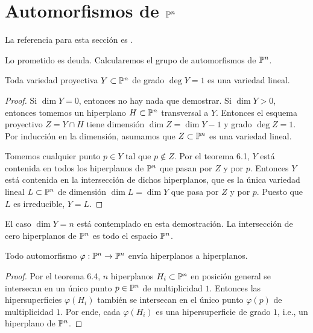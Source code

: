 \section{Automorfismos de $\P^n$}

\noindent La referencia para esta sección es \cite[pp. 228-229]{harris}.

\begin{preliminaries}
Lo prometido es deuda. Calcularemos el grupo de automorfismos de $\P^n$.
\end{preliminaries}

\begin{proposition}
Toda variedad proyectiva $Y \subset \P^n$ de grado $\deg Y = 1$ es una variedad lineal.
\end{proposition}

\begin{proof}
Si $\dim Y = 0$, entonces no hay nada que demostrar. Si $\dim Y > 0$, entonces tomemos un hiperplano $H \subset \P^n$ transversal a $Y$. Entonces el esquema proyectivo $Z = Y \cap H$ tiene dimensión $\dim Z = \dim Y - 1$ y grado $\deg Z = 1$. Por inducción en la dimensión, asumamos que $Z \subset \P^n$ es una variedad lineal.

Tomemos cualquier punto $p \in Y$ tal que $p \notin Z$. Por el teorema 6.1, $Y$ está contenida en todos los hiperplanos de $\P^n$ que pasan por $Z$ y por $p$. Entonces $Y$ está contenida en la intersección de dichos hiperplanos, que es la única variedad lineal $L \subset \P^n$ de dimensión $\dim L = \dim Y$ que pasa por $Z$ y por $p$. Puesto que $L$ es irreducible, $Y = L$.
\end{proof}

\begin{remark}
El caso $\dim Y = n$ está contemplado en esta demostración. La intersección de cero hiperplanos de $\P^n$ es todo el espacio $\P^n$.
\end{remark}

\begin{proposition}
Todo automorfismo $\varphi : \P^n \to \P^n$ envía hiperplanos a hiperplanos.
\end{proposition}

\begin{proof}
Por el teorema 6.4, $n$ hiperplanos $H_i \subset \P^n$ en posición general se intersecan en un único punto $p \in \P^n$ de multiplicidad $1$. Entonces las hipersuperficies $\varphi(H_i)$ también se intersecan en el único punto $\varphi(p)$ de multiplicidad $1$. Por ende, cada $\varphi(H_i)$ es una hipersuperficie de grado $1$, i.e., un hiperplano de $\P^n$.
\end{proof}

